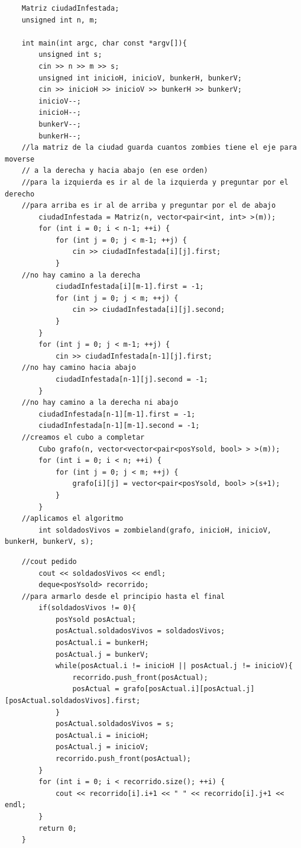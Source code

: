 	\begin{codesnippet}
	\begin{verbatim}
    Matriz ciudadInfestada;
    unsigned int n, m;
    
    int main(int argc, char const *argv[]){
        unsigned int s;
        cin >> n >> m >> s;
        unsigned int inicioH, inicioV, bunkerH, bunkerV;
        cin >> inicioH >> inicioV >> bunkerH >> bunkerV;
        inicioV--;
        inicioH--;
        bunkerV--;
        bunkerH--;
    //la matriz de la ciudad guarda cuantos zombies tiene el eje para moverse
    // a la derecha y hacia abajo (en ese orden)
    //para la izquierda es ir al de la izquierda y preguntar por el derecho
    //para arriba es ir al de arriba y preguntar por el de abajo
        ciudadInfestada = Matriz(n, vector<pair<int, int> >(m));
        for (int i = 0; i < n-1; ++i) {
            for (int j = 0; j < m-1; ++j) {
                cin >> ciudadInfestada[i][j].first;
            }
    //no hay camino a la derecha
            ciudadInfestada[i][m-1].first = -1;
            for (int j = 0; j < m; ++j) {
                cin >> ciudadInfestada[i][j].second;
            }
        }
        for (int j = 0; j < m-1; ++j) {
            cin >> ciudadInfestada[n-1][j].first;
    //no hay camino hacia abajo
            ciudadInfestada[n-1][j].second = -1;
        }
    //no hay camino a la derecha ni abajo
        ciudadInfestada[n-1][m-1].first = -1;
        ciudadInfestada[n-1][m-1].second = -1;
    //creamos el cubo a completar
        Cubo grafo(n, vector<vector<pair<posYsold, bool> > >(m));
        for (int i = 0; i < n; ++i) {
            for (int j = 0; j < m; ++j) {
                grafo[i][j] = vector<pair<posYsold, bool> >(s+1);
            }
        }
    //aplicamos el algoritmo
        int soldadosVivos = zombieland(grafo, inicioH, inicioV, bunkerH, bunkerV, s);
	\end{verbatim}
	\end{codesnippet}

	\begin{codesnippet}
	\begin{verbatim}
    //cout pedido
        cout << soldadosVivos << endl;
        deque<posYsold> recorrido;
    //para armarlo desde el principio hasta el final
        if(soldadosVivos != 0){
            posYsold posActual;
            posActual.soldadosVivos = soldadosVivos;
            posActual.i = bunkerH;
            posActual.j = bunkerV;
            while(posActual.i != inicioH || posActual.j != inicioV){
                recorrido.push_front(posActual);
                posActual = grafo[posActual.i][posActual.j][posActual.soldadosVivos].first;
            }
            posActual.soldadosVivos = s;
            posActual.i = inicioH;
            posActual.j = inicioV;
            recorrido.push_front(posActual);
        }
        for (int i = 0; i < recorrido.size(); ++i) {
            cout << recorrido[i].i+1 << " " << recorrido[i].j+1 << endl;
        }
        return 0;
    }
	\end{verbatim}
	\end{codesnippet}

